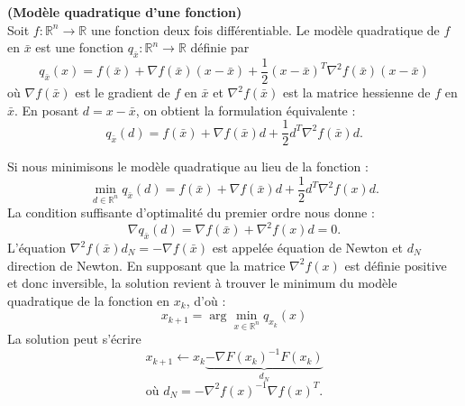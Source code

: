 \begin{frdefinition}\textbf {(Mod\`ele quadratique d'une fonction)} \\
Soit $f:\mathbb{R}^n\rightarrow \mathbb{R}$ une fonction deux fois diff\'erentiable. Le mod\`ele quadratique de $f$ en 
$\bar{x}$ est une fonction $q_{\bar{x}}:\mathbb{R}^n\rightarrow \mathbb{R}$ d\'efinie par 
$$q_{\bar{x}}(x)=f(\bar{x})+\nabla f(\bar{x})(x-\bar{x})+\frac{1}{2}(x-\bar{x})^T\nabla^2 f(\bar{x})(x-\bar{x})$$
o\`u $\nabla f(\bar{x})$ est le gradient de $f$ en $\bar{x}$ et $\nabla^2 f(\bar{x})$ est la matrice hessienne de
$f$ en $\bar{x}$. En posant $d=x-\bar{x}$, on obtient la formulation \'equivalente : 
\begin{equation*}
q_{\bar{x}}(d)=f(\bar{x})+\nabla f(\bar{x})d+\frac{1}{2}d^T\nabla^2 f(\bar{x})d.
\end{equation*}
\end{frdefinition}
Si nous minimisons le mod\`ele quadratique au lieu de la fonction :
\begin{equation*}
\min_{d\in \mathbb{R}^n} q_{\bar{x}}(d)=f(\bar{x})+\nabla f(\bar{x})d+\frac{1}{2}d^T\nabla^2f(x)d.
\end{equation*}
%
La condition suffisante d'optimalit\'e du premier ordre nous donne :
\begin{equation*}
\nabla q_{\bar{x}}(d)=\nabla f(\bar{x})+\nabla^2f(x)d=0.
\end{equation*}
%
L'\'equation $\nabla^2 f(\bar{x})d_N=-\nabla f(\bar{x})$ est appel\'ee \'equation de Newton et $d_N$ direction de Newton.
En supposant que la matrice $\nabla^2f(x)$ est d\'efinie positive et donc inversible, la 
solution revient \`a trouver le minimum du mod\`ele quadratique de la fonction en $x_k$, d'o\`u :
\begin{equation*}
x_{k+1}=\arg\min_{x\in\mathbb{R}^n} q_{x_k}(x)
\end{equation*}
La solution peut s'\'ecrire 
\begin{equation*}
x_{k+1}\leftarrow x_k\underbrace{-\nabla F(x_k)^{-1}F(x_k)}_{d_N}
\end{equation*}
\begin{equation*}
\text{o\`u } d_N=-\nabla^2f(x)^{-1}\nabla f(x)^T.
\end{equation*}
